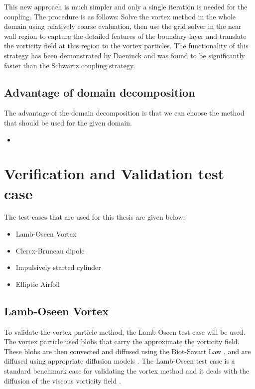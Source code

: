This new approach is much simpler and only a single iteration is needed for the coupling. The procedure is as follows: Solve the vortex method in the whole domain using relatively coarse evaluation, then use the grid solver in the near wall region to capture the detailed features of the boundary layer and translate the vorticity field at this region to the vortex particles. The functionality of this strategy has been demonstrated by Daeninck and was found to be significantly faster than the Schwartz coupling strategy.\\


\subsection{Advantage of domain decomposition}

The advantage of the domain decomposition is that we can choose the method that should be used for the given domain.

\begin{itemize}
\item 
\end{itemize}


\section{Verification and Validation test case}

The test-cases that are used for this thesis are given below:

\begin{itemize}
\item Lamb-Oseen Vortex
\item Clercx-Bruneau dipole
\item Impulsively started cylinder
\item Elliptic Airfoil
\end{itemize}

\subsection{Lamb-Oseen Vortex}
To validate the vortex particle method, the Lamb-Oseen test case will be used. The vortex particle used blobs that carry the approximate the vorticity field. These blobs are then convected and diffused using the Biot-Savart Law  \cite{Cottet2000a}, and are diffused using appropriate diffusion models \cite{Wee2006}. The Lamb-Oseen test case is a standard benchmark case for validating the vortex method and it deals with the diffusion of the viscous vorticity field \cite{Shankar1996} \cite{Speck2011a} \cite{Barba2004a}.

